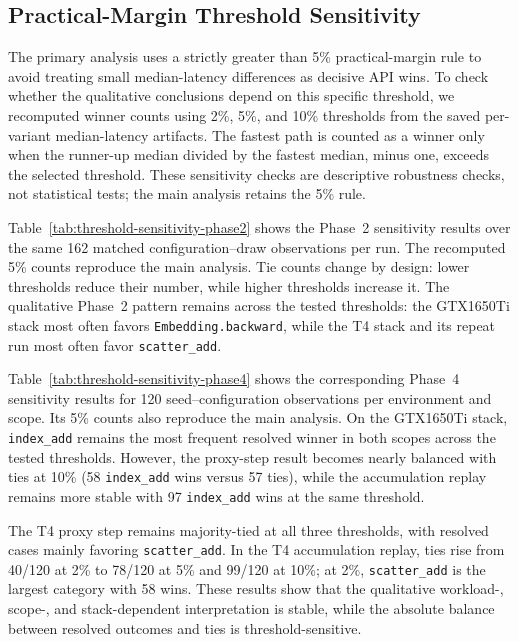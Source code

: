 

\subsection{Practical-Margin Threshold Sensitivity}
\label{sec:threshold-sensitivity}

The primary analysis uses a strictly greater than 5\% practical-margin rule to avoid treating small median-latency differences as decisive API wins. To check whether the qualitative conclusions depend on this specific threshold, we recomputed winner counts using 2\%, 5\%, and 10\% thresholds from the saved per-variant median-latency artifacts. The fastest path is counted as a winner only when the runner-up median divided by the fastest median, minus one, exceeds the selected threshold. These sensitivity checks are descriptive robustness checks, not statistical tests; the main analysis retains the 5\% rule.

Table~\ref{tab:threshold-sensitivity-phase2} shows the Phase~2 sensitivity results over the same 162 matched configuration--draw observations per run. The recomputed 5\% counts reproduce the main analysis. Tie counts change by design: lower thresholds reduce their number, while higher thresholds increase it. The qualitative Phase~2 pattern remains across the tested thresholds: the GTX1650Ti stack most often favors \texttt{Embedding.backward}, while the T4 stack and its repeat run most often favor \texttt{scatter\_add}.



Table~\ref{tab:threshold-sensitivity-phase4} shows the corresponding Phase~4 sensitivity results for 120 seed--configuration observations per environment and scope. Its 5\% counts also reproduce the main analysis. On the GTX1650Ti stack, \texttt{index\_add} remains the most frequent resolved winner in both scopes across the tested thresholds. However, the proxy-step result becomes nearly balanced with ties at 10\% (58 \texttt{index\_add} wins versus 57 ties), while the accumulation replay remains more stable with 97 \texttt{index\_add} wins at the same threshold.

The T4 proxy step remains majority-tied at all three thresholds, with resolved cases mainly favoring \texttt{scatter\_add}. In the T4 accumulation replay, ties rise from 40/120 at 2\% to 78/120 at 5\% and 99/120 at 10\%; at 2\%, \texttt{scatter\_add} is the largest category with 58 wins. These results show that the qualitative workload-, scope-, and stack-dependent interpretation is stable, while the absolute balance between resolved outcomes and ties is threshold-sensitive.

